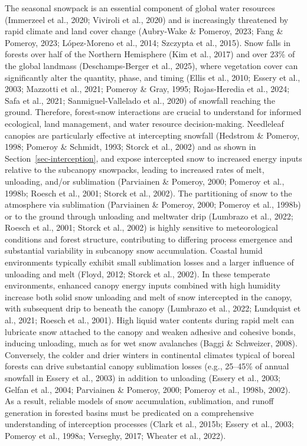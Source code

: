 \documentclass[
  letterpaper,
]{tex/uofsthesis-cs}
\begin{document}
The seasonal snowpack is an essential component of global water
resources (Immerzeel et al., 2020; Viviroli et al., 2020) and is
increasingly threatened by rapid climate and land cover change
(Aubry-Wake \& Pomeroy, 2023; Fang \& Pomeroy, 2023; López-Moreno et
al., 2014; Szczypta et al., 2015). Snow falls in forests over half of
the Northern Hemisphere (Kim et al., 2017) and over 23\% of the global
landmass (Deschamps-Berger et al., 2025), where vegetation cover can
significantly alter the quantity, phase, and timing (Ellis et al., 2010;
Essery et al., 2003; Mazzotti et al., 2021; Pomeroy \& Gray, 1995;
Rojas-Heredia et al., 2024; Safa et al., 2021; Sanmiguel-Vallelado et
al., 2020) of snowfall reaching the ground. Therefore, forest-snow
interactions are crucial to understand for informed ecological, land
management, and water resource decision-making. Needleleaf canopies are
particularly effective at intercepting snowfall (Hedstrom \& Pomeroy,
1998; Pomeroy \& Schmidt, 1993; Storck et al., 2002) and as shown in
Section~\ref{sec-interception}, and expose intercepted snow to increased
energy inputs relative to the subcanopy snowpacks, leading to increased
rates of melt, unloading, and/or sublimation (Parviainen \& Pomeroy,
2000; Pomeroy et al., 1998b; Roesch et al., 2001; Storck et al., 2002).
The partitioning of snow to the atmosphere via sublimation (Parviainen
\& Pomeroy, 2000; Pomeroy et al., 1998b) or to the ground through
unloading and meltwater drip (Lumbrazo et al., 2022; Roesch et al.,
2001; Storck et al., 2002) is highly sensitive to meteorological
conditions and forest structure, contributing to differing process
emergence and substantial variability in subcanopy snow accumulation.
Coastal humid environments typically exhibit small sublimation losses
and a larger influence of unloading and melt (Floyd, 2012; Storck et
al., 2002). In these temperate environments, enhanced canopy energy
inputs combined with high humidity increase both solid snow unloading
and melt of snow intercepted in the canopy, with subsequent drip to
beneath the canopy (Lumbrazo et al., 2022; Lundquist et al., 2021;
Roesch et al., 2001). High liquid water contents during rapid melt can
lubricate snow attached to the canopy and weaken adhesive and cohesive
bonds, inducing unloading, much as for wet snow avalanches (Baggi \&
Schweizer, 2008). Conversely, the colder and drier winters in
continental climates typical of boreal forests can drive substantial
canopy sublimation losses (e.g., 25--45\% of annual snowfall in Essery
et al., 2003) in addition to unloading (Essery et al., 2003; Gelfan et
al., 2004; Parviainen \& Pomeroy, 2000; Pomeroy et al., 1998b, 2002). As
a result, reliable models of snow accumulation, sublimation, and runoff
generation in forested basins must be predicated on a comprehensive
understanding of interception processes (Clark et al., 2015b; Essery et
al., 2003; Pomeroy et al., 1998a; Verseghy, 2017; Wheater et al., 2022).
\end{document}
